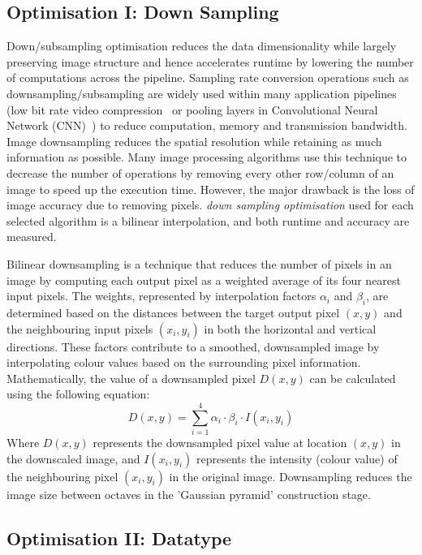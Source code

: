 \subsection{Optimisation I: Down Sampling}
Down/subsampling optimisation reduces the data dimensionality while largely preserving image structure and hence accelerates runtime by lowering the number of computations across the pipeline. Sampling rate conversion operations such as downsampling/subsampling are widely used within many application pipelines (\eg low bit rate video compression~\cite{LinDon06} or pooling layers in Convolutional Neural Network (CNN)~\cite{lecun1998gradient}) to reduce computation, memory and transmission bandwidth. Image downsampling reduces the spatial resolution while retaining as much information as possible. Many image processing algorithms use this technique to decrease the number of operations by removing every other row/column of an image to speed up the execution time. However, the major drawback is the loss of image accuracy due to removing pixels. \textit{down sampling optimisation} used for each selected algorithm is a bilinear interpolation, and both runtime and accuracy are measured. 


Bilinear downsampling is a technique that reduces the number of pixels in an image by computing each output pixel as a weighted average of its four nearest input pixels. The weights, represented by interpolation factors \(\alpha_i\) and \(\beta_i\), are determined based on the distances between the target output pixel \((x, y)\) and the neighbouring input pixels \((x_i, y_i)\) in both the horizontal and vertical directions. These factors contribute to a smoothed, downsampled image by interpolating colour values based on the surrounding pixel information. Mathematically, the value of a downsampled pixel \(D(x,y)\) can be calculated using the following equation:
\begin{equation}
D(x,y) = \sum_{i=1}^{4} \alpha_i \cdot \beta_i \cdot I(x_i, y_i)
\end{equation}
Where \(D(x,y)\) represents the downsampled pixel value at location \((x, y)\) in the downscaled image, and \(I(x_i, y_i)\) represents the intensity (colour value) of the neighbouring pixel \((x_i, y_i)\) in the original image. Downsampling reduces the image size between octaves in the 'Gaussian pyramid' construction stage.


\subsection{Optimisation II: Datatype}

